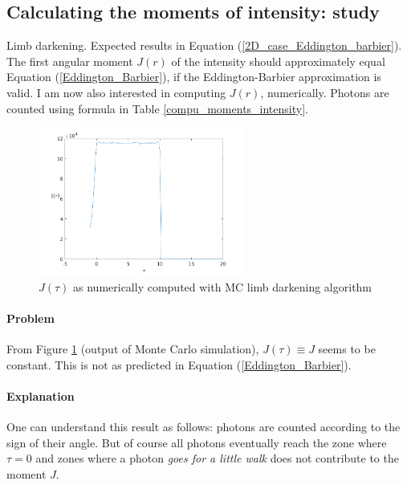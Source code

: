 \documentclass[../main/main.tex]{subfiles}
\begin{document}
\cleardoublepage
\subsection{Calculating the moments of intensity: study}
\label{limb_darkening_moments_intensity}

Limb darkening. Expected results in Equation (\ref{2D_case_Eddington_barbier}). The first angular moment $J(r)$ of the intensity should approximately equal Equation (\ref{Eddington_Barbier}), if the Eddington-Barbier approximation is valid. I am now also interested in computing $J(r)$, numerically. Photons are counted using formula in Table \ref{compu_moments_intensity}.

\begin{figure}[!htp]
\centering
\includegraphics[width=0.6\textwidth]{../../introductory_exercises/limb_darkening/figures/J_vs_tau_nphot100000.png}
\caption{$J(\tau)$ as numerically computed with MC limb darkening algorithm}
\label{J(tau)}
\end{figure}

\paragraph{Problem} From Figure \ref{J(tau)} (output of Monte Carlo simulation), $J(\tau) \equiv J$ seems to be constant. This is not as predicted in Equation (\ref{Eddington_Barbier}).

\paragraph{Explanation}
One can understand this result as follows: photons are counted according to the sign of their angle. But of course all photons eventually reach the zone where $\tau = 0$ and zones where a photon \textit{goes for a little walk} does not contribute to the moment $J$. 
\end{document}
